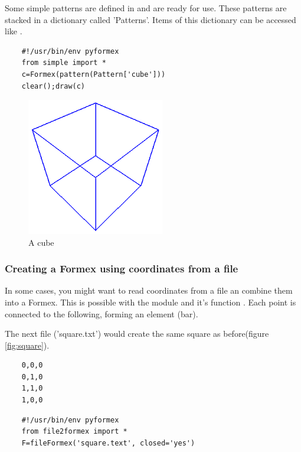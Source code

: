 Some simple patterns are defined in  and are ready for use. These patterns are stacked in a dictionary called 'Patterns'. Items of this dictionary can be accessed like .
\begin{verbatim}
	#!/usr/bin/env pyformex
	from simple import *
	c=Formex(pattern(Pattern['cube']))
	clear();draw(c)
\end{verbatim}

\begin{figure}[ht]
  \centering
  \begin{makeimage}
  \end{makeimage}
  \begin{latexonly}
    \includegraphics[width=6cm]{images/cube}
  \end{latexonly}
  \begin{htmlonly}
  \end{htmlonly}  
  \caption{A cube}
  \label{fig:cube}
\end{figure}


\subsubsection{Creating a Formex using coordinates from a file}
\outdated

In some cases, you might want to read coordinates from a file an combine them into a Formex. This is possible with the module  and it's function . Each point is connected to the following, forming an element (bar).

The next file ('square.txt') would create the same square as before(figure \ref{fig:square}).
\begin{verbatim}
	0,0,0
	0,1,0
	1,1,0
	1,0,0
\end{verbatim}
\begin{verbatim}
	#!/usr/bin/env pyformex
	from file2formex import *
	F=fileFormex('square.text', closed='yes')
\end{verbatim}



